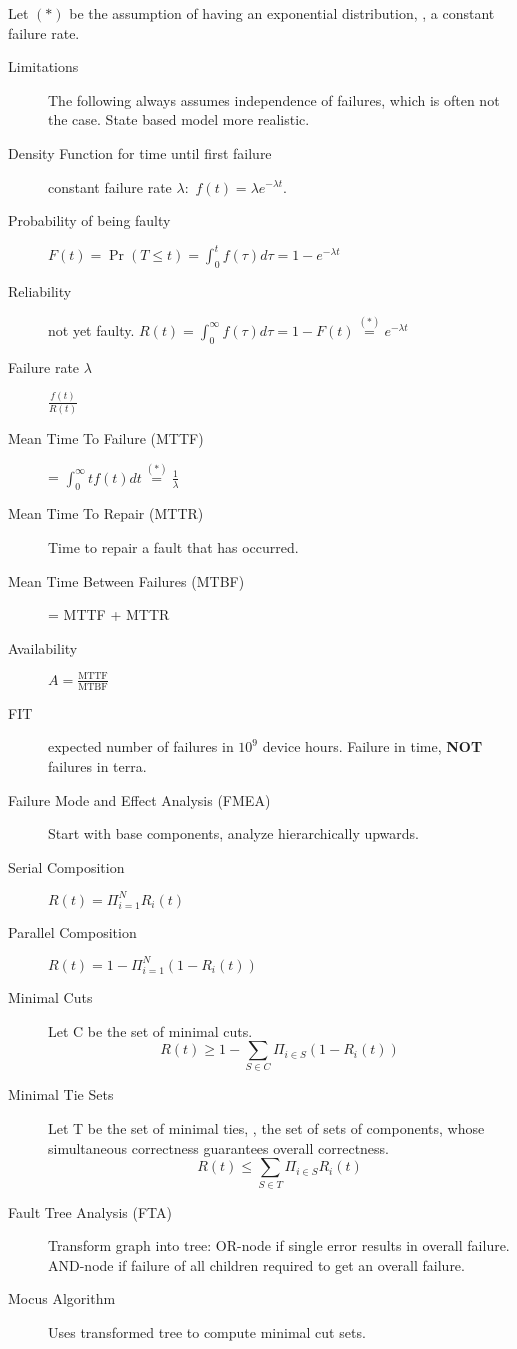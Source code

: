 Let $(*)$ be the assumption of having an exponential distribution, \ie, a
constant failure rate.
\begin{description}
    \item[Limitations] The following always assumes independence of failures,
    which is often not the case. State based model more realistic.
    \item[Density Function for time until first failure] constant failure rate
    $\lambda:$ $f(t) = \lambda e^{-\lambda t}$.
    \item[Probability of being faulty] $F(t) = \Pr(T \leq t) = \int^t_0f(\tau)
    d\tau = 1 - e^{-\lambda t}$
    \item[Reliability] not yet faulty. $R(t) = \int_0^\infty f(\tau) d\tau = 1 -
    F(t) \overset{(*)}{=} e^{-\lambda t}$
    \item[Failure rate $\lambda$] $\frac{f(t)}{R(t)}$
    \item[Mean Time To Failure (MTTF)] = $\int_0^\infty t f(t) dt \overset{(*)}
    {=} \frac{1}{\lambda}$
    \item[Mean Time To Repair (MTTR)] Time to repair a fault that has occurred.
    \item[Mean Time Between Failures (MTBF)] = MTTF + MTTR
    \item[Availability] $A = \frac{\text{MTTF}}{\text{MTBF}}$
    \item[FIT] expected number of failures in $10^9$ device hours.
    Failure in time, \textbf{NOT} failures in terra.
    \item[Failure Mode and Effect Analysis (FMEA)] Start with base components,
    analyze hierarchically upwards.
    \item[Serial Composition] $R(t) = \Pi^N_{i=1}R_i(t)$
    \item[Parallel Composition] $R(t) = 1 - \Pi^N_{i=1}(1-R_i(t))$
    \item[Minimal Cuts] Let C be the set of minimal cuts.
    \[ R(t) \geq 1 - \sum_{S \in C} \Pi_{i \in S}(1 - R_i(t)) \]
    \item[Minimal Tie Sets] Let T be the set of minimal ties, \ie, the set of
    sets of components, whose simultaneous correctness guarantees overall
    correctness.
    \[ R(t) \leq \sum_{S \in T} \Pi_{i \in S} R_i(t) \]
    \item[Fault Tree Analysis (FTA)] Transform graph into tree: OR-node if single error results in
        overall failure. AND-node if failure of all children required to get an
        overall failure.
    \item[Mocus Algorithm] Uses transformed tree to compute minimal cut sets.

\end{description}
